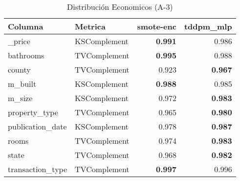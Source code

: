 \begin{table}[H]
\centering
\caption{Distribución Economicos (A-3)}
\label{table-shape-economicos-a-3}
\begin{tabular}{|l|l|r|r|}
\hline
\rowcolor[gray]{0.8}
Columna & Metrica & smote-enc & tddpm\_mlp \\
\hline \_price & KSComplement & \bfseries 0.991 & 0.986 \\
\hline bathrooms & TVComplement & \bfseries 0.995 & 0.988 \\
\hline county & TVComplement & 0.923 & \bfseries 0.967 \\
\hline m\_built & KSComplement & \bfseries 0.988 & 0.985 \\
\hline m\_size & KSComplement & 0.972 & \bfseries 0.983 \\
\hline property\_type & TVComplement & 0.965 & \bfseries 0.980 \\
\hline publication\_date & KSComplement & 0.978 & \bfseries 0.987 \\
\hline rooms & TVComplement & 0.974 & \bfseries 0.983 \\
\hline state & TVComplement & 0.968 & \bfseries 0.982 \\
\hline transaction\_type & TVComplement & \bfseries 0.997 & 0.996 \\
\hline
\end{tabular}
\end{table}

